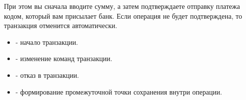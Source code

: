 При этом вы сначала вводите сумму, а затем подтверждаете отправку платежа кодом, который вам присылает банк. Если операция не будет подтверждена, то транзакция отменится автоматически.
\begin{itemize}
    \item {} - начало транзакции.
    \item {} - изменение команд транзакции.
    \item {} - отказ в транзакции.
    \item {} - формирование промежуточной точки сохранения внутри операции.
\end{itemize}